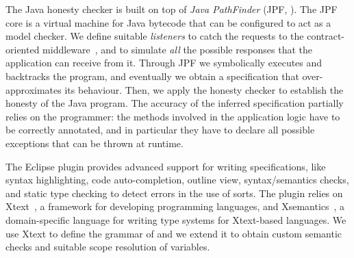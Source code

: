 The Java honesty checker is built on top of \emph{Java PathFinder}
(JPF, \cite{lerda2001addressing,visser2003model}).
The JPF core is a virtual machine for Java bytecode
that can be configured to act as a model checker.
%
We define suitable \emph{listeners} to catch the 
requests to the contract-oriented middleware~\cite{CO2middleware},
and to simulate \emph{all} the possible responses that 
the application can receive from it.
%
%
Through JPF we symbolically executes and backtracks the program, %
and eventually we obtain a \coco specification that over-approximates its behaviour.
Then, we apply the \coco honesty checker to establish the honesty of the Java program.
%
The accuracy of the inferred \coco specification partially relies on the programmer:
the methods involved in the application logic have to be correctly annotated,
and in particular they have to declare all possible exceptions that can be thrown at runtime.

The Eclipse plugin provides advanced support for writing \coco specifications,
like
syntax highlighting, 
code auto-completion, 
outline view,
syntax/semantics checks,
and static type checking to detect errors in the use of sorts.
%
The plugin relies on
Xtext~\cite{xtext-site}, a framework for developing programming languages, 
and Xsemantics~\cite{xsemantics-site}, a domain-specific language for writing type systems
for Xtext-based languages.
%
We use Xtext to define the grammar of \coco
and we extend it to obtain custom semantic checks and suitable scope resolution of variables.

